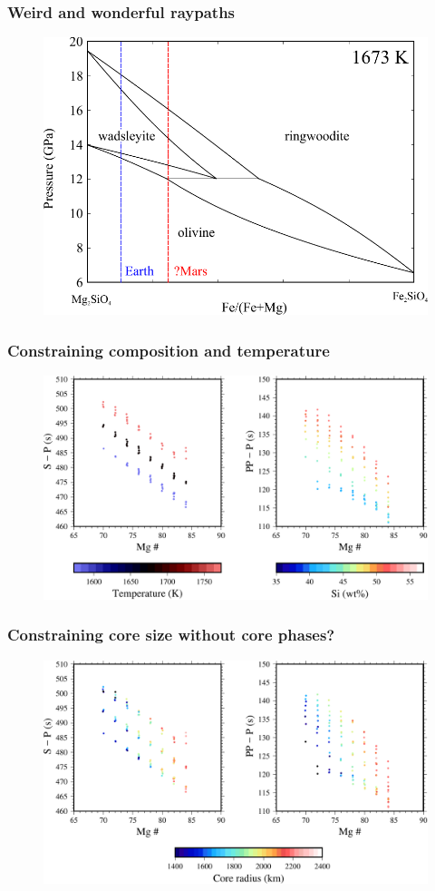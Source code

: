 \documentclass[compress,framenumber]{beamer}
\begin{document}
\begin{frame}
  \frametitle{Weird and wonderful raypaths}
  \vspace{-2.0em}
  \begin{figure}
    \includegraphics[width=0.65\linewidth]{figures/ol_wad_rw}
  \end{figure}
\end{frame}

\begin{frame}
  \frametitle{Constraining composition and temperature}
  \vspace{-2.0em}
  \begin{figure}
    \includegraphics[width=0.9\linewidth]{figures/PP_SP_differential_times.pdf}
  \end{figure}
\end{frame}

\begin{frame}
  \frametitle{Constraining core size without core phases?}
  \vspace{-2.0em}
  \begin{figure}
    \includegraphics[width=0.9\linewidth]{figures/PP_SP_differential_times_coresize.pdf}
  \end{figure}
\end{frame}
\end{document}
